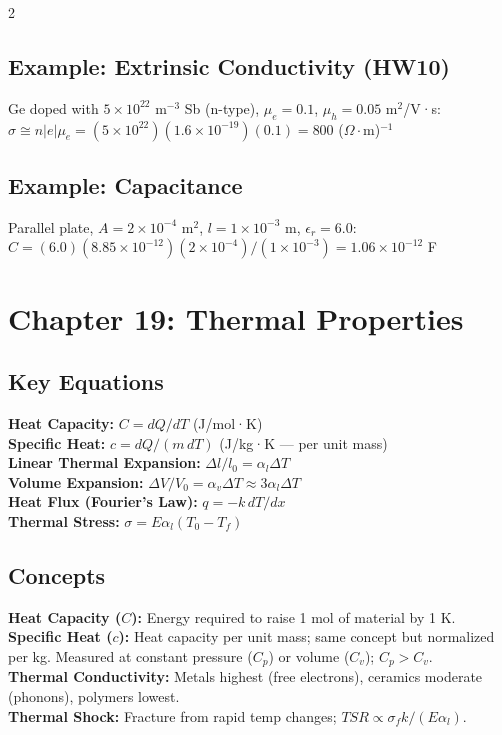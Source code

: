 \documentclass[7pt]{article}
\begin{document}
\begin{multicols*}{2}
\subsection*{Example: Extrinsic Conductivity (HW10)}
Ge doped with $5\times10^{22}$ m$^{-3}$ Sb (n-type), $\mu_e=0.1$, $\mu_h=0.05$ m$^2$/V·s: \\
$\sigma \cong n|e|\mu_e = (5\times10^{22})(1.6\times10^{-19})(0.1) = 800$ ($\Omega\cdot$m)$^{-1}$
\subsection*{Example: Capacitance}
Parallel plate, $A=2\times10^{-4}$ m$^2$, $l=1\times10^{-3}$ m, $\epsilon_r=6.0$: \\
$C = (6.0)(8.85\times10^{-12})(2\times10^{-4})/(1\times10^{-3}) = 1.06\times10^{-12}$ F

\section*{Chapter 19: Thermal Properties}
\subsection*{Key Equations}
\textbf{Heat Capacity:} $C = dQ/dT$ (J/mol·K) \\
\textbf{Specific Heat:} $c = dQ/(m\,dT)$ (J/kg·K — per unit mass) \\
\textbf{Linear Thermal Expansion:} $\Delta l/l_0 = \alpha_l \Delta T$ \\
\textbf{Volume Expansion:} $\Delta V/V_0 = \alpha_v \Delta T \approx 3\alpha_l\Delta T$ \\
\textbf{Heat Flux (Fourier's Law):} $q = -k\,dT/dx$ \\
\textbf{Thermal Stress:} $\sigma = E\alpha_l(T_0 - T_f)$
\subsection*{Concepts}
\textbf{Heat Capacity ($C$):} Energy required to raise 1 mol of material by 1 K. \\
\textbf{Specific Heat ($c$):} Heat capacity per unit mass; same concept but normalized per kg. Measured at constant pressure ($C_p$) or volume ($C_v$); $C_p > C_v$. \\
\textbf{Thermal Conductivity:} Metals highest (free electrons), ceramics moderate (phonons), polymers lowest. \\
\textbf{Thermal Shock:} Fracture from rapid temp changes; $TSR \propto \sigma_f k/(E\alpha_l)$.


\end{multicols*}
\end{document}
